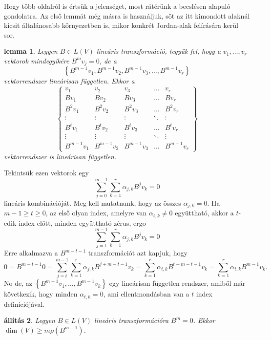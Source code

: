\documentclass[a4paper, showtrims]{memoir}
\makeatletter
\renewenvironment{proof}[1][\proofname]
    {\par\pushQED{\qed}%
    \normalfont \topsep6\p@\@plus6\p@\relax
    \trivlist
    \item[\hskip\labelsep
        \itshape
    #1\@addpunct{:}]\ignorespaces}
    {\popQED\endtrivlist\@endpefalse}
\theoremstyle{plain}
\newtheorem{proposition}{állítás}[chapter]
\newtheorem{lemma}[proposition]{lemma}
\theoremstyle{remark}
\theoremstyle{definition}
\makeatother
\begin{document}
Hogy több oldalról is értsük a jelenséget, 
most rátérünk a becslésen alapuló gondolatra.
Az első lemmát még másra is használjuk, sőt az itt kimondott alaknál kicsit általánosabb környezetben is,
mikor konkrét Jordan-alak felírására kerül sor.
\begin{lemma}
	Legyen $B\in L\left( V \right)$ lineáris transzformáció,
	tegyük fel, hogy a $v_1,\ldots,v_r$ vektorok mindegyikére $B^mv_j=0$,
	de a
	\[
		\left\{ B^{m-1}v_1,B^{m-1}v_2,B^{m-1}v_3,\ldots,B^{m-1}v_r \right\}
	\]
	vektorrendszer lineárisan független.
	Ekkor a
	\[
		\left\{
		\begin{matrix}
			v_1        & v_2        & v_3        & \dots  & v_r        \\
			Bv_1       & Bv_2       & Bv_3       & \dots  & Bv_{r}     \\
			B^2v_1     & B^2v_2     & B^2v_3     & \dots  & B^2v_r     \\
			\vdots     & \vdots     & \vdots     & \ddots & \vdots     \\
			B^{t}v_1   & B^{t}v_2   & B^{t}v_3   & \dots  & B^{t}v_r   \\
			\vdots     & \vdots     & \vdots     & \ddots & \vdots     \\
			B^{m-1}v_1 & B^{m-1}v_2 & B^{m-1}v_3 & \dots  & B^{m-1}v_r
		\end{matrix}
		\right\}
	\]
	vektorrendszer is lineárisan független.
	\label{le:nilp-fgtlen}
\end{lemma}
\begin{proof}
	Tekintsük ezen vektorok egy
	\[
		\sum_{j=0}^{m-1}\sum_{k=1}^r\alpha_{j,k}B^jv_k=0
	\]
	lineáris kombinációját.
	Meg kell mutatnunk, hogy az összes $\alpha_{j,k}=0$.
	Ha $m-1\geq t\geq 0$, az első olyan index, amelyre van $\alpha_{t,k}\neq 0$
	együttható, akkor a $t$-edik index előtt,
	minden együttható zérus, ergo
	\[
		\sum_{j=t}^{m-1}\sum_{k=1}^r\alpha_{j,k}B^jv_k=0
	\]
	Erre alkalmazva a $B^{m-t-1}$ transzformációt azt kapjuk, hogy
	\[
		0
		=
		B^{m-t-1}0
		=
		\sum_{j=t}^{m-1}\sum_{k=1}^r\alpha_{j,k}B^{j+m-t-1}v_k
		=
		\sum_{k=1}^r\alpha_{t,k}B^{t+m-t-1}v_k
		=
		\sum_{k=1}^r\alpha_{t,k}B^{m-1}v_k.
	\]
	No de, az $\left\{ B^{m-1}v_1,\ldots,B^{m-1}v_k \right\}$ egy lineárisan független rendszer,
	amiből már következik,
	hogy minden $\alpha_{t,k}=0$,
	ami ellentmondásban van a $t$ index definíciójával.
\end{proof}
\begin{proposition}
	Legyen $B\in L\left( V \right)$ lineáris transzformációra $B^m=0$.
	Ekkor $\dim(V)\geq m\rho\left( B^{m-1} \right)$.
	\label{th:nildim}
\end{proposition}
\end{document}
